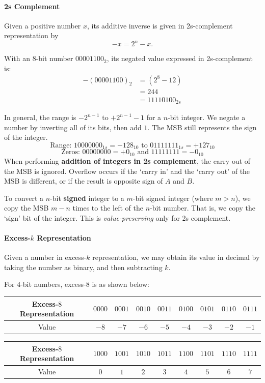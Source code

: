 \paragraph{2s Complement}
Given a positive number $x$, its additive inverse is given in  2s-complement representation by
\[-x=2^{n}-x.\] 
\begin{example}[$12_{10}$]
  With an $8$-bit number $00001100_2$, its negated value expressed in 2s-complement is:
  \begin{align*}
    -{\left( 00001100 \right)}_2&=(2^{8}-12)\\
                                &=244\\
                                &={11110100}_{2s}
  \end{align*}
\end{example}
In general, the range is $-2^{n-1}$ to $+2^{n-1}-1$ for a $n$-bit integer. We
negate a number by inverting all of its bits, then add $1$. The MSB still represents the sign
of the integer.
\[\text{Range: }10000000_{1s}=-128_{10}\text{ to }01111111_{1s}=+127_{10}\]
\[\text{Zeros: }00000000=+0_{10}\text{ and }11111111=-0_{10}\]
When performing \textbf{addition of integers in 2s complement}, the carry out of the MSB is ignored.
Overflow occurs if the `carry in' and the `carry out' of the
MSB is different, or if the result is opposite sign of $A$ and $B$.
\begin{definition}
  To convert a $n$-bit \textbf{signed} integer to a $m$-bit signed integer
  (where $m>n$), we copy the MSB $m-n$ times to the left of the $n$-bit number.
  That is, we copy the `sign' bit of the integer.  This is
  \textit{value-preserving} only for 2s complement.
\end{definition}

\paragraph{Excess-$k$ Representation} 
Given a number in excess-$k$ representation, we may obtain its value in decimal
by taking the number as binary, and then subtracting $k$.
\begin{example}[Excess-$8$]
  For $4$-bit numbers, excess-$8$ is as shown below:

\centering
\begin{tabular}{c c c c c c c c c}
  \toprule
  Excess-$8$ Representation & $0000$ & $0001$ & $0010$ & $0011$ & $0100$ & $0101$ & $0110$ & $0111$ \\
  \midrule
                           Value & $-8$ & $-7$ & $-6$ & $-5$ & $-4$ & $-3$ & $-2$ & $-1$\\
                           \bottomrule
\end{tabular}
\begin{tabular}{c c c c c c c c c}
  \toprule
  Excess-$8$ Representation& $1000$ & $1001$ & $1010$ & $1011$ & $1100$ & $1101$ & $1110$ & $1111$\\
  \midrule
  Value & $0$ & $1$ & $2$ & $3$ & $4$ & $5$ & $6$ & $7$\\
  \bottomrule
\end{tabular}
\end{example}
\raggedright%

